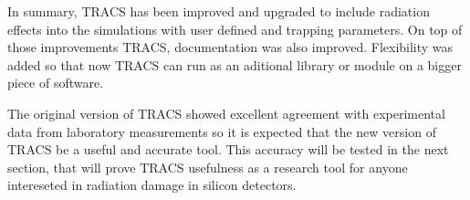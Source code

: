 In summary, TRACS has been improved and upgraded to include radiation effects into the simulations with user defined \neff and trapping parameters. On top of those improvements TRACS, documentation was also improved. Flexibility was added so that now TRACS can run as an aditional library or module on a bigger piece of software.

The original version of TRACS showed excellent agreement with experimental data from laboratory measurements so it is expected that the new version of TRACS be a useful and accurate tool. This accuracy will be tested in the next section, that will prove TRACS usefulness as a research tool for anyone intereseted in radiation damage in silicon detectors.

